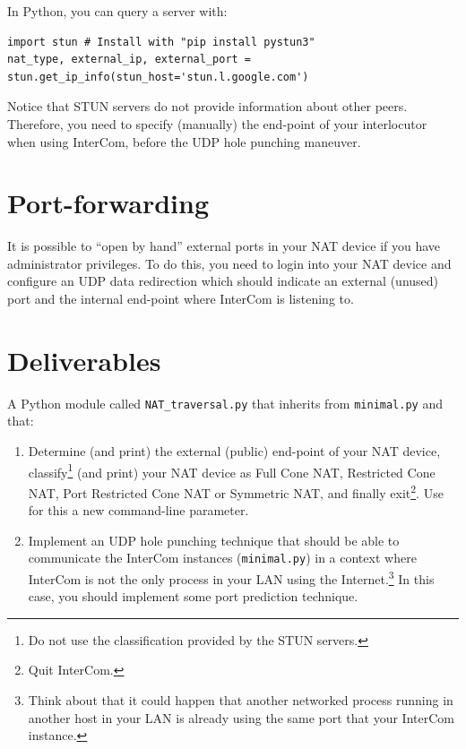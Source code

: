 In Python, you can query a server with:
\begin{verbatim}
import stun # Install with "pip install pystun3"
nat_type, external_ip, external_port = stun.get_ip_info(stun_host='stun.l.google.com')
\end{verbatim}

Notice that STUN servers do not provide information about other
peers. Therefore, you need to specify (manually) the end-point of your
interlocutor when using InterCom, before the UDP hole punching
maneuver.

\section{Port-forwarding}

It is possible to ``open by hand'' external ports in your NAT device
if you have administrator privileges. To do this, you need to login
into your NAT device and configure an UDP data redirection which
should indicate an external (unused) port and the internal end-point
where InterCom is listening to.

\section{Deliverables}

A Python module called \texttt{NAT\_traversal.py} that inherits from
\texttt{minimal.py} and that:
\begin{enumerate}
\item Determine (and print) the external (public) end-point of your
  NAT device, classify\footnote{Do not use the classification provided
    by the STUN servers.} (and print) your NAT device as Full Cone
  NAT, Restricted Cone NAT, Port Restricted Cone NAT or Symmetric NAT,
  and finally exit\footnote{Quit InterCom.}. Use for this a new
  command-line parameter.
\item Implement an UDP hole punching technique that should be able to
  communicate the InterCom instances (\texttt{minimal.py}) in a
  context where InterCom is not the only process in your LAN using the
  Internet.\footnote{Think about that it could happen that another
    networked process running in another host in your LAN is already
    using the same port that your InterCom instance.} In this case,
  you should implement some port prediction technique.
\end{enumerate}

